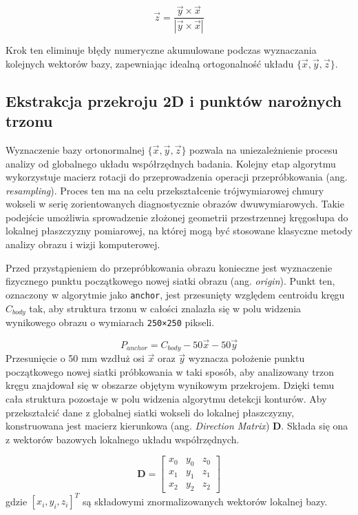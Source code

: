 \begin{equation} \label{eq:reorthogonalize_z}
    \vec{z} = \frac{\vec{y} \times \vec{x}}{|\vec{y} \times \vec{x}|}
\end{equation}

Krok ten eliminuje błędy numeryczne akumulowane podczas wyznaczania kolejnych wektorów bazy, zapewniając idealną ortogonalność układu $\{\vec{x}, \vec{y}, \vec{z}\}$.

\subsection{Ekstrakcja przekroju 2D i punktów narożnych trzonu}
\label{subsec:corner-points}

Wyznaczenie bazy ortonormalnej $\{\vec{x}, \vec{y}, \vec{z}\}$ pozwala na uniezależnienie procesu analizy od globalnego układu współrzędnych badania.
Kolejny etap algorytmu wykorzystuje macierz rotacji do przeprowadzenia operacji przepróbkowania (ang. \textit{resampling}).
Proces ten ma na celu przekształcenie trójwymiarowej chmury wokseli w serię zorientowanych diagnostycznie obrazów dwuwymiarowych.
Takie podejście umożliwia sprowadzenie złożonej geometrii przestrzennej kręgosłupa do lokalnej płaszczyzny pomiarowej, na której mogą być stosowane klasyczne metody analizy obrazu i wizji komputerowej.

Przed przystąpieniem do przepróbkowania obrazu konieczne jest wyznaczenie fizycznego punktu początkowego nowej siatki obrazu (ang. \textit{origin}).
Punkt ten, oznaczony w algorytmie jako \texttt{anchor}, jest przesunięty względem centroidu kręgu $C_{body}$ tak, aby struktura trzonu w całości znalazła się w polu widzenia wynikowego obrazu o wymiarach \texttt{250×250} pikseli.

\begin{equation} \label{eq:anchor} P_{anchor} = C_{body} - 50\vec{x} - 50\vec{y}
\end{equation}
Przesunięcie o 50 mm wzdłuż osi $\vec{x}$ oraz $\vec{y}$ wyznacza położenie punktu początkowego nowej siatki próbkowania w taki sposób, aby analizowany trzon kręgu znajdował się w obszarze objętym wynikowym przekrojem. Dzięki temu cała struktura pozostaje w polu widzenia algorytmu detekcji konturów.
Aby przekształcić dane z globalnej siatki wokseli do lokalnej płaszczyzny, konstruowana jest macierz kierunkowa (ang. \textit{Direction Matrix}) $\textbf{D}$.
Składa się ona z wektorów bazowych lokalnego układu współrzędnych.

\begin{equation} \label{eq:direction_matrix} \mathbf{D} = \begin{bmatrix}
                                                              x_0 & y_0 & z_0 \\ x_1 & y_1 & z_1 \\ x_2 & y_2 & z_2
\end{bmatrix}
\end{equation}
gdzie $[x_i, y_i, z_i]^T$ są składowymi znormalizowanych wektorów lokalnej bazy.

